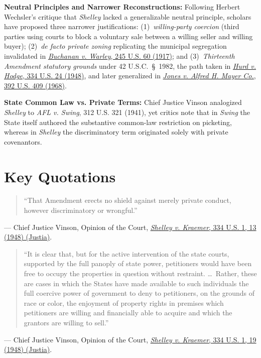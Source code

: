 \documentclass[12pt]{article}
\begin{document}
\textbf{Neutral Principles and Narrower Reconstructions:} Following Herbert Wechsler's critique that \textit{Shelley} lacked a generalizable neutral principle, scholars have proposed three narrower justifications: (1)~\textit{willing-party coercion} (third parties using courts to block a voluntary sale between a willing seller and willing buyer); (2)~\textit{de facto private zoning} replicating the municipal segregation invalidated in \href{https://supreme.justia.com/cases/federal/us/245/60/}{\textit{Buchanan v. Warley}, 245 U.S. 60 (1917)}; and (3)~\textit{Thirteenth Amendment statutory grounds} under 42 U.S.C.~\S~1982, the path taken in \href{https://supreme.justia.com/cases/federal/us/334/24/}{\textit{Hurd v. Hodge}, 334 U.S. 24 (1948)}, and later generalized in \href{https://supreme.justia.com/cases/federal/us/392/409/}{\textit{Jones v. Alfred H. Mayer Co.}, 392 U.S. 409 (1968)}.

\textbf{State Common Law vs. Private Terms:} Chief Justice Vinson analogized \textit{Shelley} to \textit{AFL v. Swing}, 312 U.S. 321 (1941), yet critics note that in \textit{Swing} the State itself authored the substantive common-law restriction on picketing, whereas in \textit{Shelley} the discriminatory term originated solely with private covenantors.

\section{Key Quotations}
\begin{quote}
``That Amendment erects no shield against merely private conduct, however discriminatory or wrongful.''
\end{quote}
\noindent --- Chief Justice Vinson, Opinion of the Court, \href{https://supreme.justia.com/cases/federal/us/334/1/}{\textit{Shelley v. Kraemer}, 334 U.S. 1, 13 (1948) (Justia)}.

\begin{quote}
``It is clear that, but for the active intervention of the state courts, supported by the full panoply of state power, petitioners would have been free to occupy the properties in question without restraint. \ldots\ Rather, these are cases in which the States have made available to such individuals the full coercive power of government to deny to petitioners, on the grounds of race or color, the enjoyment of property rights in premises which petitioners are willing and financially able to acquire and which the grantors are willing to sell.''
\end{quote}
\noindent --- Chief Justice Vinson, Opinion of the Court, \href{https://supreme.justia.com/cases/federal/us/334/1/}{\textit{Shelley v. Kraemer}, 334 U.S. 1, 19 (1948) (Justia)}.
\end{document}
